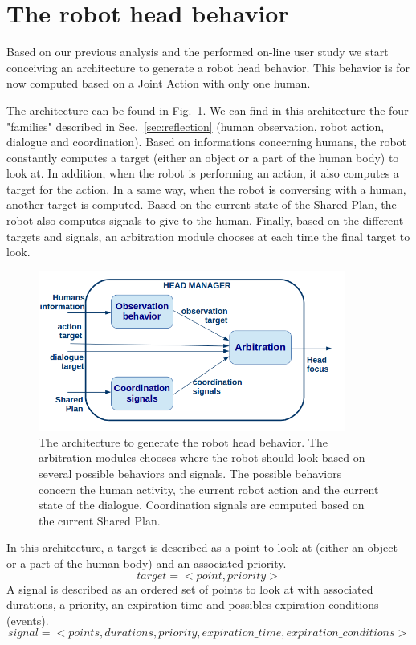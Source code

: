 \documentclass[english,a4paper,11pt,twoside]{StyleThese}
\begin{document}
\section{The robot head behavior}

Based on our previous analysis and the performed on-line user study we start conceiving an architecture to generate a robot head behavior. This behavior is for now computed based on a Joint Action with only one human.

The architecture can be found in Fig.~\ref{fig:headArchi}. We can find in this architecture the four "families" described in Sec.~\ref{sec:reflection} (human observation, robot action, dialogue and coordination). Based on informations concerning humans, the robot constantly computes a target (either an object or a part of the human body) to look at. In addition, when the robot is performing an action, it also computes a target for the action. In a same way, when the robot is conversing with a human, another target is computed. Based on the current state of the Shared Plan, the robot also computes signals to give to the human. Finally, based on the different targets and signals, an arbitration module chooses at each time the final target to look.

\begin{figure}[!h]
	\centering
    \includegraphics[width=0.9\textwidth]{figs/Chapter6/Head_archi.png}
    \caption{The architecture to generate the robot head behavior. The arbitration modules chooses where the robot should look based on several possible behaviors and signals. The possible behaviors concern the human activity, the current robot action and the current state of the dialogue. Coordination signals are computed based on the current Shared Plan.}
    \label{fig:headArchi}
\end{figure}

In this architecture, a target is described as a point to look at (either an object or a part of the human body) and an associated priority.
$$target = <point, priority>$$
A signal is described as an ordered set of points to look at with associated durations, a priority, an expiration time and possibles expiration conditions (events).
$$signal = <points, durations, priority, expiration\_time, expiration\_conditions>$$
\end{document}
